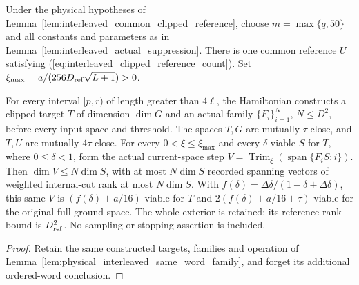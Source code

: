 \begin{lemma}
    \label{lem:physical_interleaved_family}
    \leanok
    Under the physical hypotheses of
    Lemma~\ref{lem:interleaved_common_clipped_reference}, choose
    $m=\max\{q,50\}$ and all constants and parameters as in
    Lemma~\ref{lem:interleaved_actual_suppression}. There is one common
    reference $U$ satisfying (\ref{eq:interleaved_clipped_reference_count}).
    Set $\xi_{\max}=a/(256D_{\rm ref}\sqrt{L+1})>0$.

    For every interval $[p,r)$ of length greater than $4\ell$, the
    Hamiltonian constructs a clipped target $T$ of dimension $\dim G$
    and an actual family $\{F_i\}_{i=1}^N$, $N\le D^2$, before every
    input space and threshold. The spaces $T,G$ are mutually
    $\tau$-close, and $T,U$ are mutually $4\tau$-close.
    For every $0<\xi\le\xi_{\max}$ and every $\delta$-viable $S$ for $T$,
    where $0\le\delta<1$, form the actual current-space step
    $V=\operatorname{Trim}_{\xi}(\operatorname{span}\{F_iS:i\})$.
    Then $\dim V\le N\dim S$, with at most $N\dim S$ recorded spanning
    vectors of weighted internal-cut rank at most $N\dim S$.
    With $f(\delta)=\Delta\delta/(1-\delta+\Delta\delta)$, this same $V$
    is $(f(\delta)+a/16)$-viable for $T$ and
    $2(f(\delta)+a/16+\tau)$-viable for the original full ground space.
    The whole exterior is retained; its reference rank bound is
    $D_{\rm ref}^2$. No sampling or stopping assertion is included.
\end{lemma}
\begin{proof}\leanok
    Retain the same constructed targets, families and operation of
    Lemma~\ref{lem:physical_interleaved_same_word_family}, and forget
    its additional ordered-word conclusion.
\end{proof}


